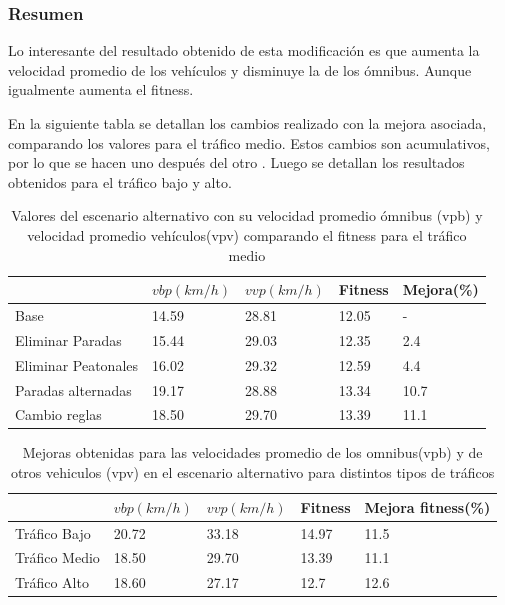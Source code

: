 \subsubsection{Resumen}
Lo interesante del resultado obtenido de esta modificación es que aumenta la velocidad promedio de los vehículos y disminuye la de los ómnibus. Aunque igualmente aumenta el fitness. 

En la siguiente tabla se detallan los cambios realizado con la mejora asociada, comparando los valores para el tráfico medio. Estos cambios son acumulativos, por lo que se hacen uno después del otro . Luego se detallan los resultados obtenidos para el tráfico bajo y alto.


\begin{table}[H]
	\renewcommand{\arraystretch}{1.2}
	\caption{Valores del escenario alternativo con su velocidad promedio ómnibus (vpb) y velocidad promedio vehículos(vpv) comparando el fitness para el tráfico medio }
	\label{table:resultado_alternativo}
	\centering
	\begin{tabular}{p{3.5cm}p{2.5cm}p{2.5cm}p{2cm}p{2cm} }
		\hline
		&
		$vbp(km/h)$& 
		$vvp(km/h)$ & 
		Fitness &
		Mejora(\%)
		\\ 
		\hline
		Base & 14.59  & 28.81& 12.05 & -\\
		Eliminar Paradas & 15.44  & 29.03& 12.35 & 2.4\\
		Eliminar Peatonales  & 16.02  & 29.32& 12.59 & 4.4\\
		Paradas alternadas  & 19.17  & 28.88& 13.34 & 10.7\\	
		Cambio reglas  & 18.50  & 29.70& 13.39 & 11.1\\				
		\hline
	\end{tabular}
\end{table}




\begin{table}[H]
	\renewcommand{\arraystretch}{1.2}
	\caption{Mejoras obtenidas para las velocidades promedio de los omnibus(vpb) y de otros vehiculos (vpv) en el escenario alternativo para distintos tipos de tráficos }
	\label{table:mejoras_trafico_alternativo}
	\centering
	\begin{tabular}{p{3.5cm}p{2.5cm}p{2.5cm}p{2cm}p{2cm} }
		\hline
		&
		$vbp(km/h)$& 
		$vvp(km/h)$ & 
		Fitness &
		Mejora fitness(\%)
		\\ 
		\hline

		Tráfico Bajo & 20.72  & 33.18 & 14.97 & 11.5\\
		Tráfico Medio & 18.50  & 29.70& 13.39 & 11.1 \\
		Tráfico Alto  & 18.60  & 27.17& 12.7 & 12.6\\		
		\hline
	\end{tabular}
\end{table}

